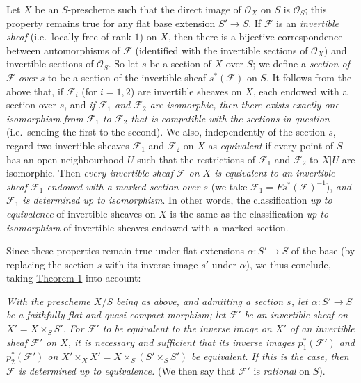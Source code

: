 \documentclass{article}
\theoremstyle{definition}
\theoremstyle{definition}
\theoremstyle{definition}
\theoremstyle{definition}
\theoremstyle{remark}
\begin{document}
Let \(X\) be an \(S\)-prescheme such that the direct image of \({\mathscr{O}}_X\) on \(S\) is \({\mathscr{O}}_S\);
this property remains true for any flat base extension \(S'\to S\).
If \({\mathcal{F}}\) is an \emph{invertible sheaf} (i.e.~locally free of rank \(1\)) on \(X\), then there is a bijective correspondence between automorphisms of \({\mathcal{F}}\) (identified with the invertible sections of \({\mathscr{O}}_X\)) and invertible sections of \({\mathscr{O}}_S\).
So let \(s\) be a section of \(X\) over \(S\);
we define a \emph{section of \({\mathcal{F}}\) over \(s\)} to be a section of the invertible sheaf \(s^*({\mathcal{F}})\) on \(S\).
It follows from the above that, if \({\mathcal{F}}_i\) (for \(i=1,2\)) are invertible sheaves on \(X\), each endowed with a section over \(s\), and \emph{if \({\mathcal{F}}_1\) and \({\mathcal{F}}_2\) are isomorphic, then there exists exactly one isomorphism from \({\mathcal{F}}_1\) to \({\mathcal{F}}_2\) that is compatible with the sections in question} (i.e.~sending the first to the second).
We also, independently of the section \(s\), regard two invertible sheaves \({\mathcal{F}}_1\) and \({\mathcal{F}}_2\) on \(X\) as \emph{equivalent} if every point of \(S\) has an open neighbourhood \(U\) such that the restrictions of \({\mathcal{F}}_1\) and \({\mathcal{F}}_2\) to \(X|U\) are isomorphic.
Then \emph{every invertible sheaf \({\mathcal{F}}\) on \(X\) is equivalent to an invertible sheaf \({\mathcal{F}}_1\) endowed with a marked section over \(s\)} (we take \({\mathcal{F}}_1=Fs^*({\mathcal{F}})^{-1}\)), \emph{and \({\mathcal{F}}_1\) is determined up to isomorphism}.
In other words, the classification \emph{up to equivalence} of invertible sheaves on \(X\) is the same as the classification \emph{up to isomorphism} of invertible sheaves endowed with a marked section.

Since these properties remain true under flat extensions \(\alpha\colon S'\to S\) of the base (by replacing the section \(s\) with its inverse image \(s'\) under \(\alpha\)), we thus conclude, taking \protect\hyperlink{fga-3-i-section-B.1-theorem-1}{Theorem 1} into account:

\emph{With the prescheme \(X/S\) being as above, and admitting a section \(s\), let \(\alpha\colon S'\to S\) be a faithfully flat and quasi-compact morphism; let \({\mathcal{F}}'\) be an invertible sheaf on \(X'=X\times_S S'\).}
\emph{For \({\mathcal{F}}'\) to be equivalent to the inverse image on \(X'\) of an invertible sheaf \({\mathcal{F}}'\) on \(X\), it is necessary and sufficient that its inverse images \(p_1^*({\mathcal{F}}')\) and \(p_2^*({\mathcal{F}}')\) on \(X'\times_X X'=X\times_S(S'\times_S S')\) be equivalent.}
\emph{If this is the case, then \({\mathcal{F}}\) is determined up to equivalence.}
(We then say that \({\mathcal{F}}'\) is \emph{rational} on \(S\)).
\end{document}
